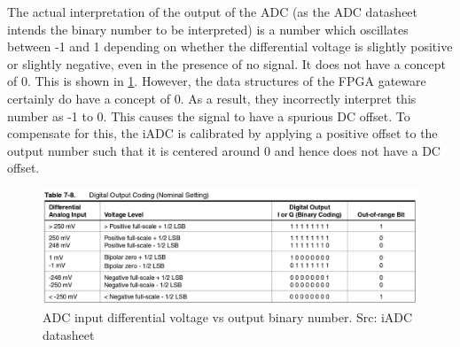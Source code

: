 The actual interpretation of the output of the ADC (as the ADC datasheet intends the binary number to be interpreted) is a number which oscillates between -1 and 1 depending on whether the differential voltage is slightly positive or slightly negative, even in the presence of no signal. It does not have a concept of 0. This is shown in \cref{fig:calibration:adc_encoding}. However, the data structures of the FPGA gateware certainly do have a concept of 0. As a result, they incorrectly interpret this number as -1 to 0. This causes the signal to have a spurious DC offset. To compensate for this, the iADC is calibrated by applying a positive offset to the output number such that it is centered around 0 and hence does not have a DC offset.

\begin{figure}
  \centering
  \includegraphics[width=\textwidth]{./img/calibration/adc_encoding}
  \caption{ADC input differential voltage vs output binary number. Src: iADC datasheet}
  \label{fig:calibration:adc_encoding}
\end{figure}
